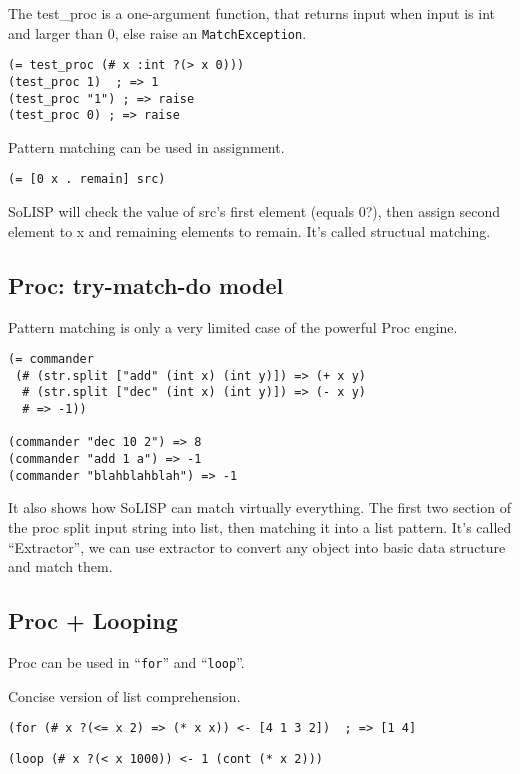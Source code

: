 \documentclass[a4paper,11pt]{article}
\begin{document}
The test\_proc is a one-argument function, that returns input when input is int and larger than 0, else raise an \verb|MatchException|.

\begin{verbatim}
(= test_proc (# x :int ?(> x 0)))
(test_proc 1)  ; => 1
(test_proc "1") ; => raise
(test_proc 0) ; => raise
\end{verbatim}

Pattern matching can be used in assignment.

\begin{verbatim}
(= [0 x . remain] src)
\end{verbatim}

SoLISP will check the value of src's first element (equals 0?), then assign second element to x and remaining elements to remain. It's called structual matching.

\subsection{Proc: try-match-do model}

Pattern matching is only a very limited case of the powerful Proc engine.

\begin{verbatim}
(= commander
 (# (str.split ["add" (int x) (int y)]) => (+ x y)
  # (str.split ["dec" (int x) (int y)]) => (- x y)
  # => -1))

(commander "dec 10 2") => 8
(commander "add 1 a") => -1
(commander "blahblahblah") => -1
\end{verbatim}

It also shows how SoLISP can match virtually everything. The first two section of the proc split input string into list, then matching it into a list pattern. It's called ``Extractor'', we can use extractor to convert any object into basic data structure and match them.

\subsection{Proc + Looping}

Proc can be used in ``\verb|for|'' and ``\verb|loop|''.

Concise version of list comprehension. 

\begin{verbatim}
(for (# x ?(<= x 2) => (* x x)) <- [4 1 3 2])  ; => [1 4]
\end{verbatim}

\begin{verbatim}
(loop (# x ?(< x 1000)) <- 1 (cont (* x 2)))
\end{verbatim}
\end{document}
